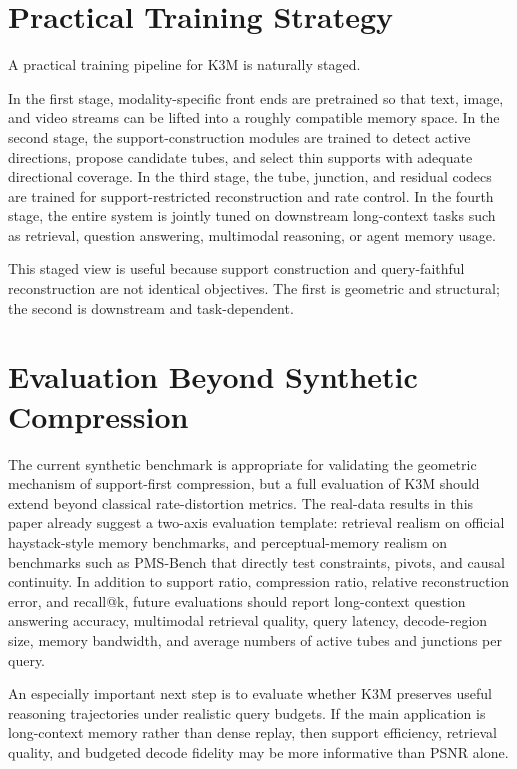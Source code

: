 \documentclass[11pt]{article}
\begin{document}
\section{Practical Training Strategy}
A practical training pipeline for K3M is naturally staged.

In the first stage, modality-specific front ends are pretrained so that text, image, and video streams can be lifted into a roughly compatible memory space. In the second stage, the support-construction modules are trained to detect active directions, propose candidate tubes, and select thin supports with adequate directional coverage. In the third stage, the tube, junction, and residual codecs are trained for support-restricted reconstruction and rate control. In the fourth stage, the entire system is jointly tuned on downstream long-context tasks such as retrieval, question answering, multimodal reasoning, or agent memory usage.

This staged view is useful because support construction and query-faithful reconstruction are not identical objectives. The first is geometric and structural; the second is downstream and task-dependent.

\section{Evaluation Beyond Synthetic Compression}
The current synthetic benchmark is appropriate for validating the geometric mechanism of support-first compression, but a full evaluation of K3M should extend beyond classical rate-distortion metrics. The real-data results in this paper already suggest a two-axis evaluation template: retrieval realism on official haystack-style memory benchmarks, and perceptual-memory realism on benchmarks such as PMS-Bench that directly test constraints, pivots, and causal continuity. In addition to support ratio, compression ratio, relative reconstruction error, and recall@k, future evaluations should report long-context question answering accuracy, multimodal retrieval quality, query latency, decode-region size, memory bandwidth, and average numbers of active tubes and junctions per query.

An especially important next step is to evaluate whether K3M preserves useful reasoning trajectories under realistic query budgets. If the main application is long-context memory rather than dense replay, then support efficiency, retrieval quality, and budgeted decode fidelity may be more informative than PSNR alone.
\end{document}
